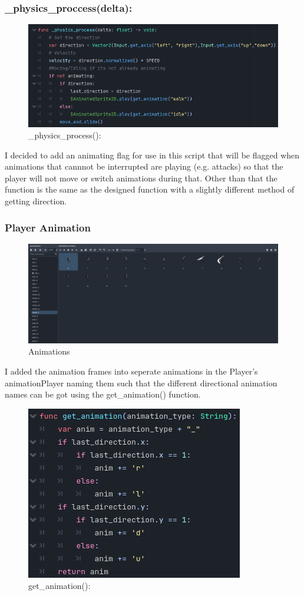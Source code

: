 \documentclass{article}
\begin{document}
        \subsubsection{\_physics\_proccess(delta):}
        \begin{figure}[H]
                \centering
                \includegraphics[width = 0.8\columnwidth]{images/development/Player_physics_process().PNG}
                \caption{\_physics\_process():}
        \end{figure}
        \noindent I decided to add an animating flag for use in this script that will be flagged when animations that cannnot be interrupted are playing (e.g. attacks) so that the player will not move or switch animations during that. Other than that the function is the same as the designed function with a slightly different method of getting direction.\\
        \subsubsection{Player Animation}
        \begin{figure}[H]
                \centering
                \includegraphics[width = 0.8\columnwidth]{images/development/Animations.PNG}
                \caption{Animations}
        \end{figure}
        I added the animation frames into seperate animations in the Player's animationPlayer naming them such that the different directional animation names can be got using the get\_animation() function.\\
        \begin{figure}[H]
                \centering
                \includegraphics[width = 0.5\columnwidth]{images/development/Player_get_anim.PNG}
                \caption{get\_animation():}
        \end{figure}
\end{document}
